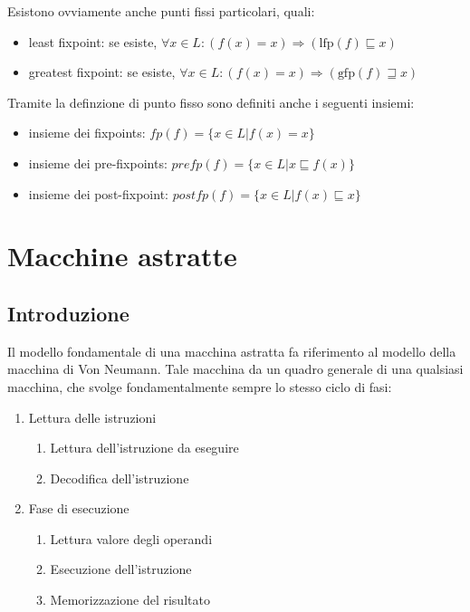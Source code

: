 \documentclass[a4paper, 10pt]{article}
\begin{document}
	Esistono ovviamente anche punti fissi particolari, quali:
	\begin{itemize}
		\item least fixpoint: se esiste, $\forall x \in L: (f(x)=x) \Rightarrow (\text{lfp}(f) \sqsubseteq x)$
		
		\item greatest fixpoint: se esiste, $\forall x \in L: (f(x)=x) \Rightarrow (\text{gfp}(f) \sqsupseteq x)$
	\end{itemize}

	Tramite la definzione di punto fisso sono definiti anche i seguenti insiemi:
	\begin{itemize}
		\item insieme dei fixpoints: $fp(f)= \lbrace x \in L | f(x)=x \rbrace$
		\item insieme dei pre-fixpoints: $prefp(f)= \lbrace x \in L | x \sqsubseteq f(x) \rbrace$
		\item insieme dei post-fixpoint: $postfp(f)= \lbrace x \in L | f(x) \sqsubseteq x \rbrace$
	\end{itemize}
	
	
	\section{Macchine astratte}
	\subsection{Introduzione}
	Il modello fondamentale di una macchina astratta fa riferimento al modello della macchina di Von Neumann. Tale macchina da un quadro generale di una qualsiasi macchina, che svolge fondamentalmente sempre lo stesso ciclo di fasi:
	\begin{enumerate}
		\item Lettura delle istruzioni
		\begin{enumerate}
			\item Lettura dell'istruzione da eseguire
			\item Decodifica dell'istruzione
		\end{enumerate}
		\item Fase di esecuzione
		\begin{enumerate}
			\item Lettura valore degli operandi
			\item Esecuzione dell'istruzione
			\item Memorizzazione del risultato
		\end{enumerate}
	\end{enumerate}
	
\end{document}
